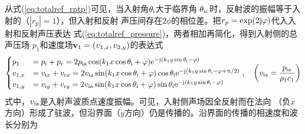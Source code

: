 \documentclass[UTF8]{ctexbook}
\begin{document}
从式(\ref{eq:totalref_rptp})可见，当入射角$\theta_\text{i}$大于临界角
$\theta_\text{ic}$时，反射波的振幅等于入射的（$|r_p|=1$），但入射和反射
声压间存在$2\phi$的相位差。把$r_p=\exp(2\mathrm{j} \varphi)$代入入射和反射声压表达
式(\ref{eq:totalref_pressure})，两者相加再简化，得到入射侧的总声压场
$p_1$和速度场$\vb{v}_1=(v_{1,x}, v_{2,y})$的表达式
\begin{equation}
	\begin{cases}
		p_1&= p\st{i}+p\st{r} = 2p\st{ia}\cos(k_1x\cos\theta\st{i}+\phi)
		\me^{-\mj (k_1y\sin\theta\st{i}-\phi)}\\
		v_{1,x}&= v_{\mi x} + v_{\mathrm{r}x} = 2v\st{ia}\sin
		(k_1x\cos\theta\st{i}+\phi)\cos\theta\st{i}
		\me^{-\mj \qty(k_1y\sin\theta\st{i}-\phi+ \uppi/2)}\\
		v_{1,y}&= v_{\mi y} + v_{\mathrm{r}y} = 2v\st{ia}\sin
		(k_1x\cos\theta\st{i}+\phi)\sin\theta\st{i}
		\me^{-\mj \qty(k_1y\sin\theta\st{i}-\phi)}
	\end{cases}
	\qc \qty(v\st{ia} = \frac{p\st{ia}}{\rho_1c_1})
\end{equation}
式中，$v_\text{ia}$是入射声波质点速度振幅。可见，入射侧声场因全反射而在法向
（负$x$方向）形成了驻波，但沿界面（$y$方向）仍是传播的。沿界面的传播的相速度和波长分别为
 
\end{document}
